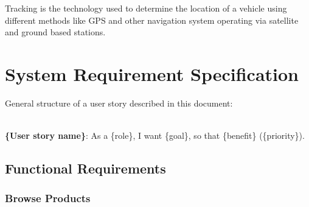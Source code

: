 Tracking is the technology used to determine the location of a vehicle using different methods like GPS and
other navigation system operating via satellite and ground based stations.



\section{System Requirement Specification}
General structure of a user story described in this document: 
\\ \\
\begin{normalsize}
\textbf{\{User story name\}}: As a \{role\}, I want \{goal\}, so that \{benefit\} (\{priority\}).
\end{normalsize}

\subsection{Functional Requirements}
\subsubsection{Browse Products}

